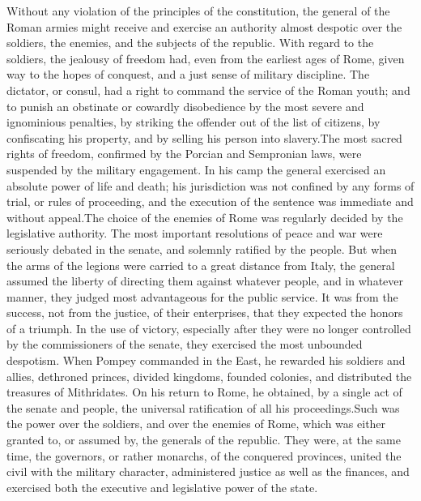 Without any violation of the principles of the constitution, the
general of the Roman armies might receive and exercise an
authority almost despotic over the soldiers, the enemies, and the
subjects of the republic. With regard to the soldiers, the
jealousy of freedom had, even from the earliest ages of Rome,
given way to the hopes of conquest, and a just sense of military
discipline. The dictator, or consul, had a right to command the
service of the Roman youth; and to punish an obstinate or
cowardly disobedience by the most severe and ignominious
penalties, by striking the offender out of the list of citizens,
by confiscating his property, and by selling his person into
slavery.\footnotemark[7] The most sacred rights of freedom, confirmed by the
Porcian and Sempronian laws, were suspended by the military
engagement. In his camp the general exercised an absolute power
of life and death; his jurisdiction was not confined by any forms
of trial, or rules of proceeding, and the execution of the
sentence was immediate and without appeal.\footnotemark[8] The choice of the
enemies of Rome was regularly decided by the legislative
authority. The most important resolutions of peace and war were
seriously debated in the senate, and solemnly ratified by the
people. But when the arms of the legions were carried to a great
distance from Italy, the general assumed the liberty of directing
them against whatever people, and in whatever manner, they judged
most advantageous for the public service. It was from the
success, not from the justice, of their enterprises, that they
expected the honors of a triumph. In the use of victory,
especially after they were no longer controlled by the
commissioners of the senate, they exercised the most unbounded
despotism. When Pompey commanded in the East, he rewarded his
soldiers and allies, dethroned princes, divided kingdoms, founded
colonies, and distributed the treasures of Mithridates. On his
return to Rome, he obtained, by a single act of the senate and
people, the universal ratification of all his proceedings.\footnotemark[9] Such
was the power over the soldiers, and over the enemies of Rome,
which was either granted to, or assumed by, the generals of the
republic. They were, at the same time, the governors, or rather
monarchs, of the conquered provinces, united the civil with the
military character, administered justice as well as the finances,
and exercised both the executive and legislative power of the
state.


